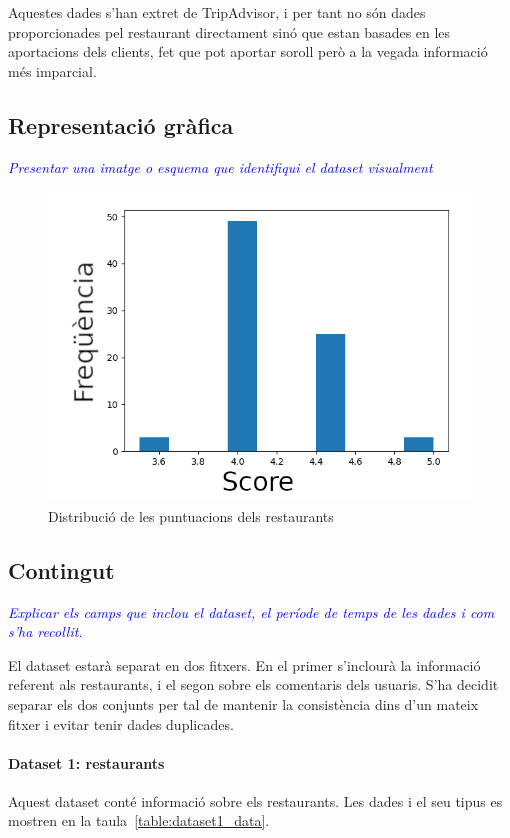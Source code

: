 \documentclass{article}
\newcommand\enunciat[2][blue]{\textcolor{#1}{\emph{#2}}}
\begin{document}
Aquestes dades s'han extret de TripAdvisor, i per tant no són dades
proporcionades pel restaurant directament sinó que estan basades en les
aportacions dels clients, fet que pot aportar soroll però a la vegada
informació més imparcial.


\subsection{Representació gràfica}
\enunciat{Presentar una imatge o esquema que identifiqui el dataset visualment}
\begin{figure}
	\centering
	\includegraphics{plot.png}
	\caption{Distribució de les puntuacions dels restaurants}
	\label{fig:plot}
\end{figure}

\subsection{Contingut}\label{sec:contingut}
\enunciat{Explicar els camps que inclou el dataset, el període de temps de les
dades i com s'ha recollit.}

El dataset estarà separat en dos fitxers. En el primer s'inclourà la informació
referent als restaurants, i el segon sobre els comentaris dels usuaris. S'ha
decidit separar els dos conjunts per tal de mantenir la consistència dins d'un
mateix fitxer i evitar tenir dades duplicades.

\paragraph{Dataset 1: restaurants}
Aquest dataset conté informació sobre els restaurants. Les dades i el seu tipus
es mostren en la taula~\ref{table:dataset1_data}.
\end{document}
